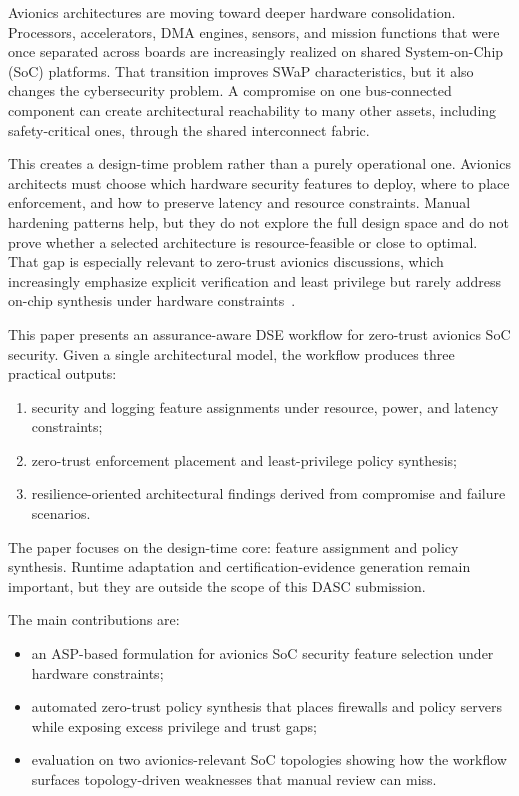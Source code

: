 \documentclass[conference]{IEEEtran}
\begin{document}
Avionics architectures are moving toward deeper hardware consolidation.
Processors, accelerators, DMA engines, sensors, and mission functions that
were once separated across boards are increasingly realized on shared
System-on-Chip (SoC) platforms. That transition improves SWaP
characteristics, but it also changes the cybersecurity problem. A compromise
on one bus-connected component can create architectural reachability to many
other assets, including safety-critical ones, through the shared interconnect
fabric.

This creates a design-time problem rather than a purely operational one.
Avionics architects must choose which hardware security features to deploy,
where to place enforcement, and how to preserve latency and resource
constraints. Manual hardening patterns help, but they do not explore the full
design space and do not prove whether a selected architecture is
resource-feasible or close to optimal. That gap is especially relevant to
zero-trust avionics discussions, which increasingly emphasize explicit
verification and least privilege but rarely address on-chip synthesis under
hardware constraints~\cite{nist_zta,ztas_dasc}.

This paper presents an assurance-aware DSE workflow for zero-trust avionics
SoC security. Given a single architectural model, the workflow produces three
practical outputs:
\begin{enumerate}
\item security and logging feature assignments under resource, power, and
latency constraints;
\item zero-trust enforcement placement and least-privilege policy synthesis;
\item resilience-oriented architectural findings derived from compromise and
failure scenarios.
\end{enumerate}

The paper focuses on the design-time core: feature assignment and policy
synthesis. Runtime adaptation and certification-evidence generation remain
important, but they are outside the scope of this DASC submission.

The main contributions are:
\begin{itemize}
\item an ASP-based formulation for avionics SoC security feature selection
under hardware constraints;
\item automated zero-trust policy synthesis that places firewalls and policy
servers while exposing excess privilege and trust gaps;
\item evaluation on two avionics-relevant SoC topologies showing how the
workflow surfaces topology-driven weaknesses that manual review can miss.
\end{itemize}
\end{document}
